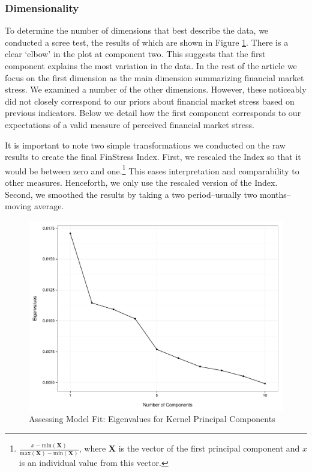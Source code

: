 \documentclass[]{article}
\begin{document}
\subsubsection{Dimensionality}\label{dimensionality}

To determine the number of dimensions that best describe the data, we conducted a scree test, the results of which are shown in Figure \ref{scree_plot}. There is a clear `elbow' in the plot at component two. This suggests that the first component explains the most variation in the data. In the rest of the article we focus on the first dimension as the main dimension summarizing financial market stress. We examined a number of the other dimensions. However, these noticeably did not closely correspond to our priors about financial market stress based on previous indicators. Below we detail how the first component corresponds to our expectations of a valid measure of perceived financial market stress.

It is important to note two simple transformations we conducted on the raw results to create the final FinStress Index. First, we rescaled the Index so that it would be between zero and one.\footnote{\(\frac{x - \mathrm{min}(\bm{X})}{\mathrm{max}(\bm{X}) - \mathrm{min}(\bm{X})}\),
  where \(\bm{X}\) is the vector of the first principal component and
  \(x\) is an individual value from this vector.} This eases
interpretation and comparability to other measures. Henceforth, we only use the rescaled version of the Index. Second, we smoothed the results by taking a two period--usually two months--moving average.

\begin{figure}
    \caption{Assessing Model Fit: Eigenvalues for Kernel Principal Components}
    \label{scree_plot}
    \begin{center}
        \includegraphics[scale=0.5]{figures/scree_plot.pdf}
    \end{center}
\end{figure}
\end{document}
